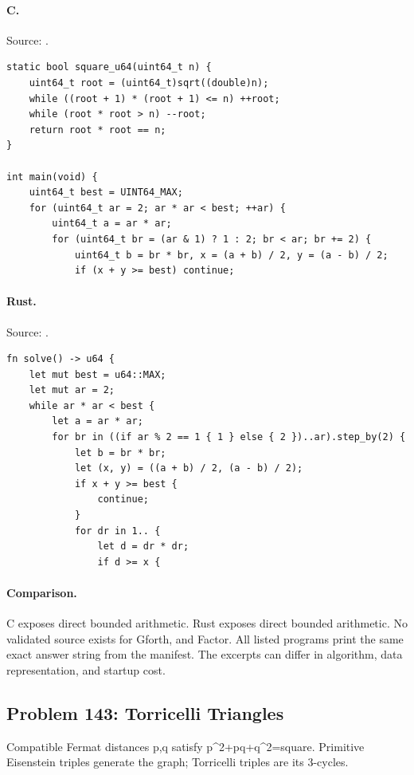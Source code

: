 \paragraph{C.} Source: .
\begin{lstlisting}
static bool square_u64(uint64_t n) {
    uint64_t root = (uint64_t)sqrt((double)n);
    while ((root + 1) * (root + 1) <= n) ++root;
    while (root * root > n) --root;
    return root * root == n;
}

int main(void) {
    uint64_t best = UINT64_MAX;
    for (uint64_t ar = 2; ar * ar < best; ++ar) {
        uint64_t a = ar * ar;
        for (uint64_t br = (ar & 1) ? 1 : 2; br < ar; br += 2) {
            uint64_t b = br * br, x = (a + b) / 2, y = (a - b) / 2;
            if (x + y >= best) continue;
\end{lstlisting}

\paragraph{Rust.} Source: .
\begin{lstlisting}
fn solve() -> u64 {
    let mut best = u64::MAX;
    let mut ar = 2;
    while ar * ar < best {
        let a = ar * ar;
        for br in ((if ar % 2 == 1 { 1 } else { 2 })..ar).step_by(2) {
            let b = br * br;
            let (x, y) = ((a + b) / 2, (a - b) / 2);
            if x + y >= best {
                continue;
            }
            for dr in 1.. {
                let d = dr * dr;
                if d >= x {
\end{lstlisting}

\paragraph{Comparison.}
C exposes direct bounded arithmetic. Rust exposes direct bounded arithmetic.
No validated source exists for Gforth, and Factor.
All listed programs print the same exact answer string from the manifest. The excerpts can differ in algorithm, data representation, and startup cost.

\subsection{Problem 143: Torricelli Triangles}
\label{walkthrough:p143}
Compatible Fermat distances p,q satisfy p\textasciicircum{}2+pq+q\textasciicircum{}2=square. Primitive Eisenstein triples generate the graph; Torricelli triples are its 3-cycles.

